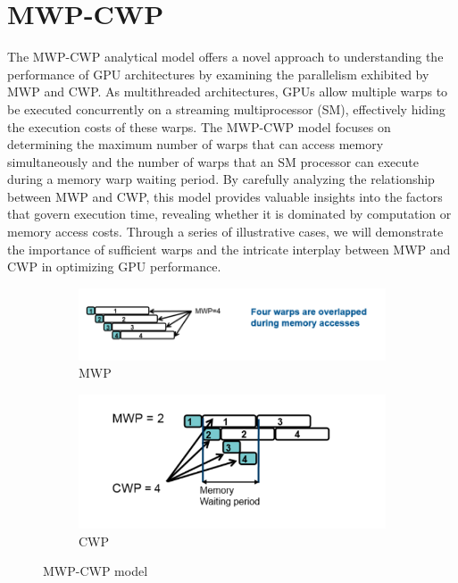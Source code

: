 \section{MWP-CWP}
\label{sec:mwp-cwp}

The MWP-CWP analytical model offers a novel approach to understanding the performance of GPU 
architectures by examining the parallelism exhibited by MWP and CWP. As multithreaded architectures, GPUs allow multiple warps 
to be executed concurrently on a streaming multiprocessor (SM), effectively hiding the execution 
costs of these warps. The MWP-CWP model focuses on determining the maximum number of warps that 
can access memory simultaneously and the number of warps that an SM processor can execute during 
a memory warp waiting period. By carefully analyzing the relationship between MWP and CWP, this 
model provides valuable insights into the factors that govern execution time, revealing whether 
it is dominated by computation or memory access costs. Through a series of illustrative cases, we 
will demonstrate the importance of sufficient warps and the intricate interplay between MWP and CWP 
in optimizing GPU performance.\cite{DBLP:conf/isca/HongK09,marcmwpcwpslides}

\begin{figure}[H]
	\centering %
	\begin{subfigure}[b]{0.55\textwidth}
        \includegraphics[width=\linewidth]{Figures/MWP.png}
        \caption{MWP}
        \label{fig:mwp}
	\end{subfigure}\hfil %
	\begin{subfigure}[b]{0.45\textwidth}
		\includegraphics[width=\linewidth]{Figures/CWP.png}
	    \caption{CWP}
	    \label{fig:cwp}
	\end{subfigure}
	\label{fig:mwpcwpmodel}
    \caption{MWP-CWP model}
\end{figure}

